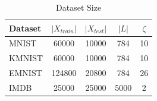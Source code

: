 \begin{table}
\caption{Dataset Size}
\label{tab:dataset-size-dkd}
\begin{tabular}{|l|c|c|c|c|}
\hline
Dataset & $|X_{train}|$ & $|X_{test}|$ & $|L|$ & $\zeta$ \\
\hline
MNIST & 60000 & 10000 & 784 & 10 \\\hline
KMNIST & 60000 & 10000 & 784 & 10 \\\hline
EMNIST & 124800 & 20800 & 784 & 26 \\\hline
IMDB & 25000 & 25000 & 5000 & 2 \\\hline
\end{tabular}
\end{table}
